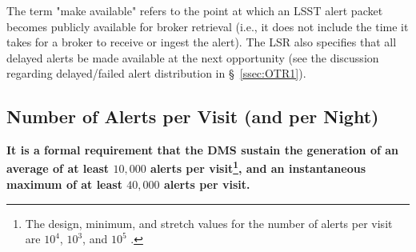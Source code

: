 \documentclass[DM,authoryear,toc]{lsstdoc}
\begin{document}
The term "make available" refers to the point at which an LSST alert packet becomes publicly available for broker retrieval (i.e., it does not include the time it takes for a broker to receive or ingest the alert). The LSR also specifies that all delayed alerts be made available at the next opportunity (see the discussion regarding delayed/failed alert distribution in \S~\ref{ssec:OTR1}).




\subsection{Number of Alerts per Visit (and per Night)}\label{ssec:transN}

{\bf It is a formal requirement that the DMS sustain the generation of an average of at least $10,000$ alerts per visit\footnote{The design, minimum, and stretch values for the number of alerts per visit are $10^4$, $10^3$, and $10^5$ .}, and an instantaneous maximum of at least $40,000$ alerts per visit.}
\end{document}
